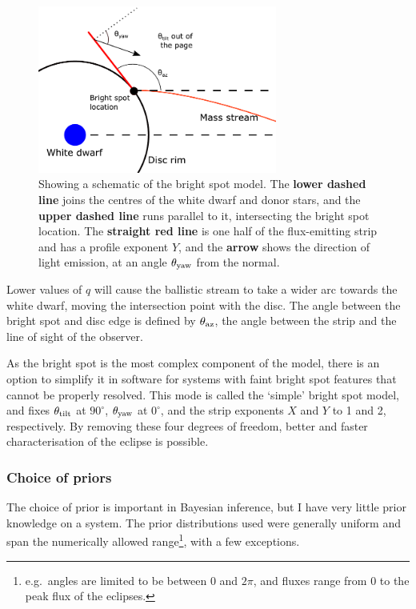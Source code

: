 \begin{figure}
    \centering
    \includegraphics[width=0.7\textwidth]{figures/modelling/bright_spot_schematic.pdf}
    \caption{Showing a schematic of the bright spot model. The {\bf lower dashed line} joins the centres of the white dwarf and donor stars, and the {\bf upper dashed line} runs parallel to it, intersecting the bright spot location. The {\bf straight red line} is one half of the flux-emitting strip and has a profile exponent $Y$, and the {\bf arrow} shows the direction of light emission, at an angle $\theta_{\rm yaw}$ from the normal.}
    \label{fig:modelling:bright spot schematic}
\end{figure}

Lower values of $q$ will cause the ballistic stream to take a wider arc towards the white dwarf, moving the intersection point with the disc. The angle between the bright spot and disc edge is defined by $\theta_{\rm az}$, the angle between the strip and the line of sight of the observer.

As the bright spot is the most complex component of the model, there is an option to simplify it in software for systems with faint bright spot features that cannot be properly resolved.
This mode is called the `simple' bright spot model, and fixes $\theta_{\rm tilt}$ at $90^\circ$, $\theta_{\rm yaw}$ at $0^\circ$, and the strip exponents $X$ and $Y$ to 1 and 2, respectively. By removing these four degrees of freedom, better and faster characterisation of the eclipse is possible.

\subsubsection{Choice of priors}

The choice of prior is important in Bayesian inference, but I have very little prior knowledge on a system. The prior distributions used were generally uniform and span the numerically allowed range\footnote{e.g.\ angles are limited to be between 0 and $2\pi$, and fluxes range from 0 to the peak flux of the eclipses.}, with a few exceptions.

